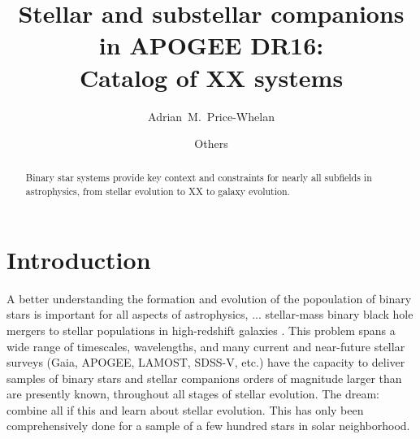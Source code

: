 \documentclass[modern]{aastex62}
\begin{document}
\title{Stellar and substellar companions in APOGEE DR16: \\
       Catalog of XX systems}

\author[0000-0003-0872-7098]{Adrian~M.~Price-Whelan}



\author{Others}

\begin{abstract}
Binary star systems provide key context and constraints for nearly all subfields in astrophysics, from stellar evolution to XX to galaxy evolution.
\end{abstract}

\keywords{}


\section{Introduction} \label{sec:intro}

A better understanding the formation and evolution of the popoulation of binary stars is important for all aspects of astrophysics, ... stellar-mass binary black hole mergers to stellar populations in high-redshift galaxies \citep[e.g.,][]{Breivik:2019, Rix:2019}.
This problem spans a wide range of timescales, wavelengths, and many current and near-future stellar surveys (Gaia, APOGEE, LAMOST, SDSS-V, etc.) have the capacity to deliver samples of binary stars and stellar companions orders of magnitude larger than are presently known, throughout all stages of stellar evolution.
The dream: combine all if this and learn about stellar evolution.
This has only been comprehensively done for a sample of a few hundred stars in solar neighborhood.
\end{document}
